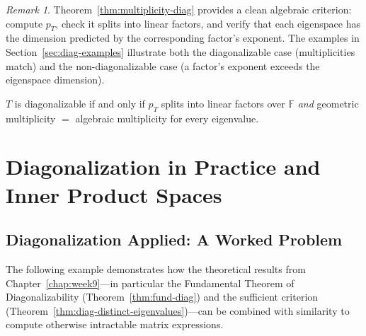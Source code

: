 \documentclass[11pt, a4paper, notitlepage]{report}
\theoremstyle{definition}
\theoremstyle{remark}
\newtheorem{remark}[theorem]{Remark}
\begin{document}
\begin{remark}
Theorem~\ref{thm:multiplicity-diag} provides a clean algebraic criterion: compute $p_T$,
check it splits into linear factors, and verify that each eigenspace has the dimension predicted
by the corresponding factor's exponent. The examples in Section~\ref{sec:diag-examples}
illustrate both the diagonalizable case (multiplicities match) and the non-diagonalizable case
(a factor's exponent exceeds the eigenspace dimension).
\end{remark}

\begin{keyresult}[title={Key Result: Multiplicity Criterion}]
$T$ is diagonalizable if and only if $p_T$ splits into linear factors over $\mathbb{F}$
\emph{and} geometric multiplicity $=$ algebraic multiplicity for every eigenvalue.
\end{keyresult}

\chapter{Diagonalization in Practice and Inner Product Spaces}
\label{chap:week10}

\section{Diagonalization Applied: A Worked Problem}
\label{sec:diag-applied}

The following example demonstrates how the theoretical results from
Chapter~\ref{chap:week9}---in particular the Fundamental Theorem of
Diagonalizability (Theorem~\ref{thm:fund-diag}) and the sufficient
criterion (Theorem~\ref{thm:diag-distinct-eigenvalues})---can be
combined with similarity to compute otherwise intractable matrix
expressions.
\end{document}
